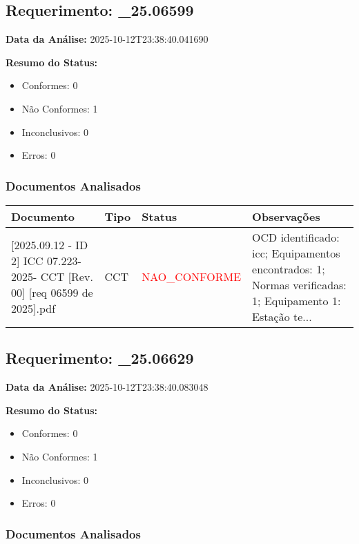 \documentclass[12pt,a4paper]{article}
\begin{document}
\subsection{Requerimento: \_25.06599}

\textbf{Data da Análise:} 2025-10-12T23:38:40.041690

\textbf{Resumo do Status:}
\begin{itemize}
    \item Conformes: 0
    \item Não Conformes: 1
    \item Inconclusivos: 0
    \item Erros: 0
\end{itemize}

\subsubsection{Documentos Analisados}

\begin{longtable}{|p{4cm}|p{2cm}|p{2cm}|p{6cm}|}
\hline
\textbf{Documento} & \textbf{Tipo} & \textbf{Status} & \textbf{Observações} \\
\hline
\endhead
[Certificado de Conformidade Técnica - CCT][2025.09.12 - ID 2] ICC 07.223-2025- CCT [Rev. 00] [req 06599 de 2025].pdf & CCT & \textcolor{red}{NAO\_CONFORME} & OCD identificado: icc; Equipamentos encontrados: 1; Normas verificadas: 1; Equipamento 1: Estação te... \\
\hline
\end{longtable}


\subsection{Requerimento: \_25.06629}

\textbf{Data da Análise:} 2025-10-12T23:38:40.083048

\textbf{Resumo do Status:}
\begin{itemize}
    \item Conformes: 0
    \item Não Conformes: 1
    \item Inconclusivos: 0
    \item Erros: 0
\end{itemize}

\subsubsection{Documentos Analisados}
\end{document}
